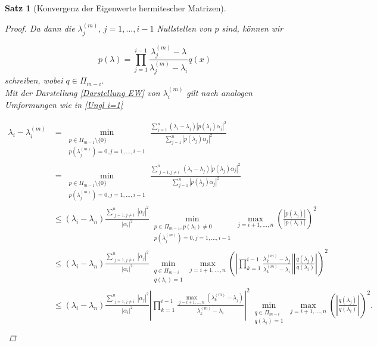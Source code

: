 \documentclass{article}
\theoremstyle{plain}
\newtheorem{theorem}    {Satz}   [section]
\begin{document}
\begin{theorem}[Konvergenz der Eigenwerte hermitescher Matrizen]
\begin{proof}
	Da dann die $\lambda_j^{(m)}, \, j = 1,\dots,i-1$ Nullstellen von $p$ sind, können wir

	\begin{equation*}
		p(\lambda) = \prod_{j = 1}^{i-1} \frac{\lambda_j^{(m)} -\lambda}{\lambda_j^{(m)} - \lambda_i} q(x)
	\end{equation*}
	schreiben, wobei $q \in \Pi_{m-i}$.\\

	Mit der Darstellung \eqref{Darstellung EW} von $\lambda_i^{(m)}$ gilt nach analogen Umformungen wie in \eqref{Ungl i=1}

	\begin{equation*}
		\begin{aligned}
			\lambda_i - \lambda_i^{(m)} &= \min_{\substack{p\in \Pi_{m-1}\setminus \{0\} \\ p(\lambda_j^{(m)}) = 0, j = 1,\dots,i-1}} \frac{\sum_{j=1}^{n} (\lambda_i - \lambda_j)|p(\lambda_j)\alpha_j|^2}{\sum_{j=1}^{n} |p(\lambda_j)\alpha_j|^2} \\
			&= \min_{\substack{p\in \Pi_{m-1}\setminus \{0\} \\ p(\lambda_j^{(m)}) = 0, j = 1,\dots,i-1}} \frac{\sum_{\substack{j=1, j\neq i}}^{n} (\lambda_i - \lambda_j)|p(\lambda_j)\alpha_j|^2}{\sum_{j=1}^{n} |p(\lambda_j)\alpha_j|^2} \\
			& \le (\lambda_i - \lambda_n) \frac{\sum_{\substack{j=1, j\neq i}}^{n} |\alpha_j|^2}{|\alpha_i|^2} \min_{\substack{p\in \Pi_{m-1}, p(\lambda_i) \neq 0 \\ p(\lambda_j^{(m)}) = 0, j = 1,\dots,i-1}} \max_{j=i+1,\dots,n} \left(\frac{|p(\lambda_j)|}{|p(\lambda_i)|}\right)^2 \\
			&\le (\lambda_i - \lambda_n) \frac{\sum_{\substack{j=1, j\neq i}}^{n} |\alpha_j|^2}{|\alpha_i|^2} \min_{\substack{q\in \Pi_{m-i} \\ q(\lambda_i) = 1}} \max_{j=i+1,\dots,n} \left(\left|\prod_{k = 1}^{i-1} \frac{\lambda_k^{(m)} -\lambda_j}{\lambda_k^{(m)} - \lambda_i}\right| \left|\frac{q(\lambda_j)}{q(\lambda_i)}\right|\right)^2 \\
			&\le (\lambda_i - \lambda_n) \frac{\sum_{\substack{j=1, j\neq i}}^{n} |\alpha_j|^2}{|\alpha_i|^2} \left|\prod_{k = 1}^{i-1} \frac{\max_{j=i+1,\dots,n} (\lambda_k^{(m)} -\lambda_j)}{\lambda_k^{(m)} - \lambda_i}\right|^2 \min_{\substack{q\in \Pi_{m-i} \\ q(\lambda_i) = 1}} \max_{j=i+1,\dots,n} \left(\left|\frac{q(\lambda_j)}{q(\lambda_i)}\right|\right)^2. \\
		\end{aligned}
	\end{equation*}


\end{proof}
\end{theorem}
\end{document}
